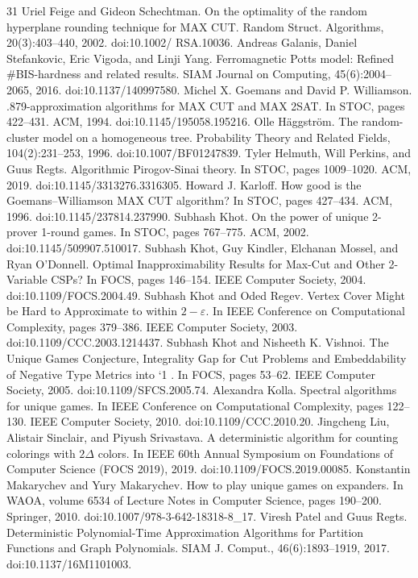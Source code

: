 \begin{thebibliography}{31}
Uriel Feige and Gideon Schechtman. On the optimality of the random hyperplane rounding technique for MAX CUT. Random Struct. Algorithms, 20(3):403–440, 2002. doi:10.1002/ RSA.10036.
Andreas Galanis, Daniel Stefankovic, Eric Vigoda, and Linji Yang. Ferromagnetic Potts model: Refined \#BIS-hardness and related results. SIAM Journal on Computing, 45(6):2004–2065, 2016. doi:10.1137/140997580.
Michel X. Goemans and David P. Williamson. .879-approximation algorithms for MAX CUT and MAX 2SAT. In STOC, pages 422–431. ACM, 1994. doi:10.1145/195058.195216.
Olle Häggström. The random-cluster model on a homogeneous tree. Probability Theory and Related Fields, 104(2):231–253, 1996. doi:10.1007/BF01247839.
Tyler Helmuth, Will Perkins, and Guus Regts. Algorithmic Pirogov-Sinai theory. In STOC, pages 1009–1020. ACM, 2019. doi:10.1145/3313276.3316305.
Howard J. Karloff. How good is the Goemans–Williamson MAX CUT algorithm? In STOC, pages 427–434. ACM, 1996. doi:10.1145/237814.237990.
Subhash Khot. On the power of unique 2-prover 1-round games. In STOC, pages 767–775. ACM, 2002. doi:10.1145/509907.510017.
Subhash Khot, Guy Kindler, Elchanan Mossel, and Ryan O’Donnell. Optimal Inapproximability Results for Max-Cut and Other 2-Variable CSPs? In FOCS, pages 146–154. IEEE Computer Society, 2004. doi:10.1109/FOCS.2004.49.
Subhash Khot and Oded Regev. Vertex Cover Might be Hard to Approximate to within $2-\varepsilon$. In IEEE Conference on Computational Complexity, pages 379–386. IEEE Computer Society, 2003. doi:10.1109/CCC.2003.1214437.
Subhash Khot and Nisheeth K. Vishnoi. The Unique Games Conjecture, Integrality Gap for Cut Problems and Embeddability of Negative Type Metrics into `1 . In FOCS, pages 53–62. IEEE Computer Society, 2005. doi:10.1109/SFCS.2005.74.
Alexandra Kolla. Spectral algorithms for unique games. In IEEE Conference on Computational Complexity, pages 122–130. IEEE Computer Society, 2010. doi:10.1109/CCC.2010.20.
Jingcheng Liu, Alistair Sinclair, and Piyush Srivastava. A deterministic algorithm for counting colorings with $2\Delta$ colors. In IEEE 60th Annual Symposium on Foundations of Computer Science (FOCS 2019), 2019. doi:10.1109/FOCS.2019.00085.
Konstantin Makarychev and Yury Makarychev. How to play unique games on expanders. In WAOA, volume 6534 of Lecture Notes in Computer Science, pages 190–200. Springer, 2010. doi:10.1007/978-3-642-18318-8\_17.
Viresh Patel and Guus Regts. Deterministic Polynomial-Time Approximation Algorithms for Partition Functions and Graph Polynomials. SIAM J. Comput., 46(6):1893–1919, 2017. doi:10.1137/16M1101003.

\end{thebibliography}
